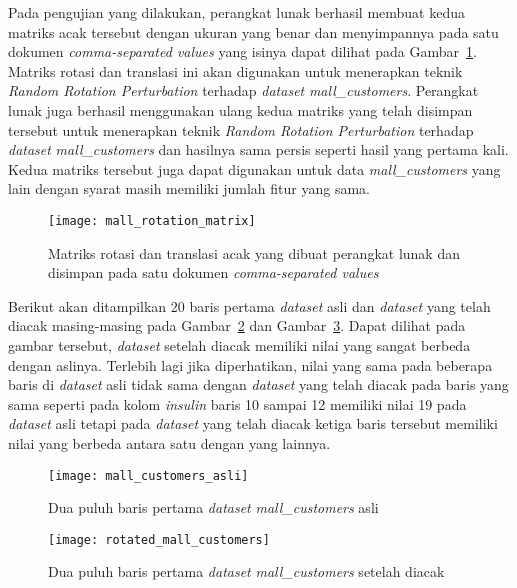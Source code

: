 Pada pengujian yang dilakukan, perangkat lunak berhasil membuat kedua matriks acak tersebut dengan ukuran yang benar dan menyimpannya pada satu dokumen \textit{comma-separated values} yang isinya dapat dilihat pada Gambar~\ref{fig:mall_rotation_matrix}. Matriks rotasi dan translasi ini akan digunakan untuk menerapkan teknik \textit{Random Rotation Perturbation} terhadap \textit{dataset} \textit{mall\_customers}. Perangkat lunak juga berhasil menggunakan ulang kedua matriks yang telah disimpan tersebut untuk menerapkan teknik \textit{Random Rotation Perturbation} terhadap \textit{dataset} \textit{mall\_customers} dan hasilnya sama persis seperti hasil yang pertama kali. Kedua matriks tersebut juga dapat digunakan untuk data \textit{mall\_customers} yang lain dengan syarat masih memiliki jumlah fitur yang sama.

\begin{figure}
	\centering
	\texttt{[image: mall\_rotation\_matrix]}
	\caption{Matriks rotasi dan translasi acak yang dibuat perangkat lunak dan disimpan pada satu dokumen  \textit{comma-separated values}}
	\label{fig:mall_rotation_matrix}
\end{figure}

Berikut akan ditampilkan 20 baris pertama \textit{dataset} asli dan \textit{dataset} yang telah diacak masing-masing pada Gambar~\ref{fig:mall_customers_asli} dan Gambar~\ref{fig:rotated_mall_customers}. Dapat dilihat pada gambar tersebut, \textit{dataset} setelah diacak memiliki nilai yang sangat berbeda dengan aslinya. Terlebih lagi jika diperhatikan, nilai yang sama pada beberapa baris di \textit{dataset} asli tidak sama dengan \textit{dataset} yang telah diacak pada baris yang sama seperti pada kolom \textit{insulin} baris 10 sampai 12 memiliki nilai 19 pada \textit{dataset} asli tetapi pada \textit{dataset} yang telah diacak ketiga baris tersebut memiliki nilai yang berbeda antara satu dengan yang lainnya.

\begin{figure}
	\centering
	\texttt{[image: mall\_customers\_asli]}
	\caption{Dua puluh baris pertama \textit{dataset} \textit{mall\_customers} asli}
	\label{fig:mall_customers_asli}
\end{figure}

\begin{figure}
	\centering
	\texttt{[image: rotated\_mall\_customers]}
	\caption{Dua puluh baris pertama \textit{dataset} \textit{mall\_customers} setelah diacak}
	\label{fig:rotated_mall_customers}
\end{figure}

